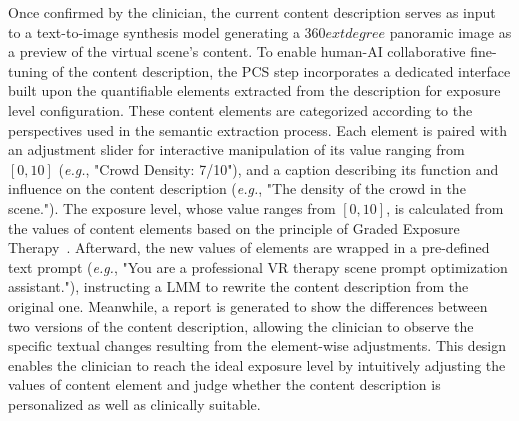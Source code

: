 \documentclass[]{interact}
\newcommand{\eg}{\emph{e.g.}}
\begin{document}
Once confirmed by the clinician, the current content description serves as input to a text-to-image synthesis model generating a $360	extdegree$ panoramic image as a preview of the virtual scene's content.
To enable human-AI collaborative fine-tuning of the content description, the PCS step incorporates a dedicated interface built upon the quantifiable elements extracted from the description for exposure level configuration. These content elements are categorized according to the perspectives used in the semantic extraction process. Each element is paired with an adjustment slider for interactive manipulation of its value ranging from $[0,10]$ (\eg, "Crowd Density: 7/10"), and a caption describing its function and influence on the content description (\eg, "The density of the crowd in the scene.").
The exposure level, whose value ranges from $[0,10]$, is calculated from the values of content elements based on the principle of Graded Exposure Therapy~\cite{Wiederhold2002}.
Afterward, the new values of elements are wrapped in a pre-defined text prompt (\eg, "You are a professional VR therapy scene prompt optimization assistant."), instructing a LMM to rewrite the content description from the original one.
Meanwhile, a report is generated to show the differences between two versions of the content description, allowing the clinician to observe the specific textual changes resulting from the element-wise adjustments.
This design enables the clinician to reach the ideal exposure level by intuitively adjusting the values of content element and judge whether the content description is personalized as well as clinically suitable.
\end{document}
